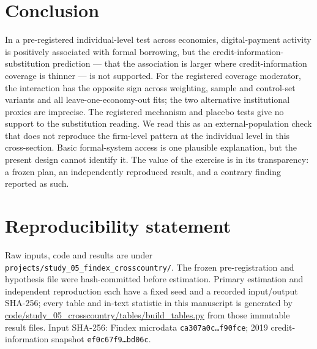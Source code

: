 \section{Conclusion}

In a pre-registered individual-level test across \NEconomies{} economies, digital-payment
activity is positively associated with formal borrowing, but the
credit-information-substitution prediction --- that the association is larger where
credit-information coverage is thinner --- is not supported. For the registered coverage
moderator, the interaction has the opposite sign across weighting, sample and control-set
variants and all leave-one-economy-out fits; the two alternative institutional proxies are
imprecise. The registered mechanism and placebo tests give no support to the substitution
reading. We read this as an external-population check that does not reproduce the firm-level
pattern at the individual level in this cross-section. Basic formal-system access is one
plausible explanation, but the present design cannot identify it. The value of the exercise
is in its transparency: a frozen plan, an independently reproduced result, and a contrary
finding reported as such.

\section*{Reproducibility statement}

Raw inputs, code and results are under \texttt{projects/study\_05\_findex\_crosscountry/}.
The frozen pre-registration and hypothesis file were hash-committed before estimation.
Primary estimation and independent reproduction each have a fixed seed and a recorded
input/output SHA-256; every table and in-text statistic in this manuscript is generated by
\url{code/study_05_crosscountry/tables/build_tables.py} from those immutable result
files. Input SHA-256: Findex microdata \texttt{ca307a0c\ldots f90fce}; 2019
credit-information snapshot \texttt{ef0c67f9\ldots bd06c}.
